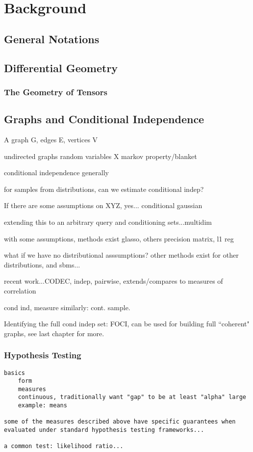 \chapter{Background}\label{sec:bknd}

\section{General Notations}



\section{Differential Geometry}

\subsection{The Geometry of Tensors}


\section{Graphs and Conditional Independence}

A graph G, edges E, vertices V

undirected graphs
random variables X
markov property/blanket

conditional independence generally

for samples from distributions, can we estimate conditional indep?

If there are some assumptions on XYZ, yes...
conditional gaussian

extending this to an arbitrary query and conditioning sets...multidim

with some assumptions, methods exist
glasso, others
precision matrix, l1 reg

what if we have no distributional asssumptions?
other methods exist for other distributions, and sbms...

recent work...CODEC, 
indep, pairwise, extends/compares to measures of correlation

cond ind, measure similarly:
cont.
sample.

Identifying the full cond indep set: FOCI, 
can be used for building full ``coherent" graphs, see last chapter for more.

\subsection{Hypothesis Testing}
\begin{verbatim}
basics
    form
    measures
    continuous, traditionally want "gap" to be at least "alpha" large
    example: means

some of the measures described above have specific guarantees when evaluated under standard hypothesis testing frameworks...

a common test: likelihood ratio...
\end{verbatim}

